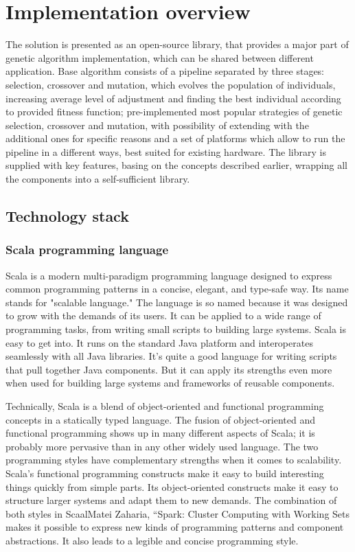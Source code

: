 \section{Implementation overview}

The solution is presented as an open-source library, that provides a major part of genetic algorithm implementation, which can be shared between different application. Base algorithm consists of a pipeline separated by three stages: selection, crossover and mutation, which evolves the population of individuals, increasing average level of adjustment and finding the best individual according to provided fitness function; pre-implemented most popular strategies of genetic selection, crossover and mutation, with possibility of extending with the additional ones for specific reasons and a set of platforms which allow to run the pipeline in a different ways, best suited for existing hardware. The library is supplied with key features, basing on the concepts described earlier, wrapping all the components into a self-sufficient library.

\subsection{Technology stack}

\subsubsection{Scala programming language}

Scala is a modern multi-paradigm programming language designed to express common programming patterns in a concise, elegant, and type-safe way. Its name stands for "scalable language." The language is so named because it was designed to grow with the demands of its users. It can be applied to a wide range of programming tasks, from writing small scripts to building large systems.
Scala is easy to get into. It runs on the standard Java platform and interoperates seamlessly with all Java libraries. It's quite a good language for writing scripts that pull together Java components. But it can apply its strengths even more when used for building large systems and frameworks of reusable components. \cite{programming_in_scala}

Technically, Scala is a blend of object-oriented and functional programming concepts in a statically typed language. The fusion of object-oriented and functional programming shows up in many different aspects of Scala; it is probably more pervasive than in any other widely used language. The two programming styles have complementary strengths when it comes to scalability. Scala's functional programming constructs make it easy to build interesting things quickly from simple parts. Its object-oriented constructs make it easy to structure larger systems and adapt them to new demands. The combination of both styles in ScaalMatei Zaharia, “Spark: Cluster Computing with Working Sets
 makes it possible to express new kinds of programming patterns and component abstractions. It also leads to a legible and concise programming style. \cite{programming_in_scala}

